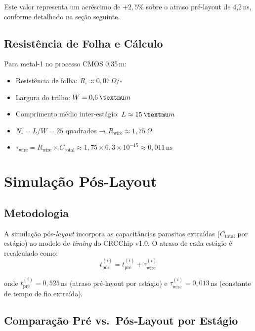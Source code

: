 \documentclass[12pt,a4paper]{article}
\begin{document}
Este valor representa um acréscimo de $+2{,}5\%$ sobre o atraso pré-layout de 4,2\,ns, conforme detalhado na seção seguinte.

\subsection{Resistência de Folha e Cálculo}

Para metal-1 no processo CMOS 0,35\,\textmu m:
\begin{itemize}
  \item Resistência de folha: $R_\square \approx 0{,}07\,\Omega/\square$
  \item Largura do trilho: $W = 0{,}6\,\textmu m$
  \item Comprimento médio inter-estágio: $L \approx 15\,\textmu m$
  \item $N_\square = L/W = 25$ quadrados → $R_{\text{wire}} \approx 1{,}75\,\Omega$
  \item $\tau_{\text{wire}} = R_{\text{wire}} \times C_{\text{total}} \approx 1{,}75 \times 6{,}3 \times 10^{-15} \approx 0{,}011\,\text{ns}$
\end{itemize}

\section{Simulação Pós-Layout}

\subsection{Metodologia}

A simulação pós-\textit{layout} incorpora as capacitâncias parasitas extraídas ($C_{\text{total}}$ por estágio) ao modelo de \textit{timing} do CRCChip v1.0. O atraso de cada estágio é recalculado como:
\begin{equation}
  t_{\text{pós}}^{(i)} = t_{\text{pré}}^{(i)} + \tau_{\text{wire}}^{(i)}
\end{equation}

onde $t_{\text{pré}}^{(i)} = 0{,}525$\,ns (atraso pré-layout por estágio) e $\tau_{\text{wire}}^{(i)} = 0{,}013$\,ns (constante de tempo de fio extraída).

\subsection{Comparação Pré vs.\ Pós-Layout por Estágio}
\end{document}
